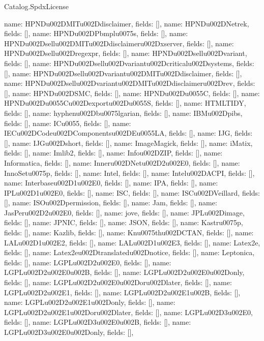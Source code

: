\begin{lexlean}{Catalog.SpdxLicense}
\begin{semanticmodule}
{    {name: HPNDu002DMITu002Ddisclaimer, fields: []},
    {name: HPNDu002DNetrek, fields: []},
    {name: HPNDu002DPbmplu0075s, fields: []},
    {name: HPNDu002Dsellu002DMITu002Ddisclaimeru002Dxserver, fields: []},
    {name: HPNDu002Dsellu002Dregexpr, fields: []},
    {name: HPNDu002Dsellu002Dvariant, fields: []},
    {name: HPNDu002Dsellu002Dvariantu002Dcriticalu002Dsystems, fields: []},
    {name: HPNDu002Dsellu002Dvariantu002DMITu002Ddisclaimer, fields: []},
    {name: HPNDu002Dsellu002Dvariantu002DMITu002Ddisclaimeru002Drev, fields: []},
    {name: HPNDu002DSMC, fields: []},
    {name: HPNDu002Du0055C, fields: []},
    {name: HPNDu002Du0055Cu002Dexportu002Du0055S, fields: []},
    {name: HTMLTIDY, fields: []},
    {name: hyphenu002Dbu0075lgarian, fields: []},
    {name: IBMu002Dpibs, fields: []},
    {name: ICu0055, fields: []},
    {name: IECu002DCodeu002DComponentsu002DEu0055LA, fields: []},
    {name: IJG, fields: []},
    {name: IJGu002Dshort, fields: []},
    {name: ImageMagick, fields: []},
    {name: iMatix, fields: []},
    {name: Imlib2, fields: []},
    {name: Infou002DZIP, fields: []},
    {name: Informatica, fields: []},
    {name: Inneru002DNetu002D2u002E0, fields: []},
    {name: InnoSetu0075p, fields: []},
    {name: Intel, fields: []},
    {name: Intelu002DACPI, fields: []},
    {name: Interbaseu002D1u002E0, fields: []},
    {name: IPA, fields: []},
    {name: IPLu002D1u002E0, fields: []},
    {name: ISC, fields: []},
    {name: ISCu002DVeillard, fields: []},
    {name: ISOu002Dpermission, fields: []},
    {name: Jam, fields: []},
    {name: JasPeru002D2u002E0, fields: []},
    {name: jove, fields: []},
    {name: JPLu002Dimage, fields: []},
    {name: JPNIC, fields: []},
    {name: JSON, fields: []},
    {name: Kastru0075p, fields: []},
    {name: Kazlib, fields: []},
    {name: Knu0075thu002DCTAN, fields: []},
    {name: LALu002D1u002E2, fields: []},
    {name: LALu002D1u002E3, fields: []},
    {name: Latex2e, fields: []},
    {name: Latex2eu002Dtranslatedu002Dnotice, fields: []},
    {name: Leptonica, fields: []},
    {name: LGPLu002D2u002E0, fields: []},
    {name: LGPLu002D2u002E0u002B, fields: []},
    {name: LGPLu002D2u002E0u002Donly, fields: []},
    {name: LGPLu002D2u002E0u002Doru002Dlater, fields: []},
    {name: LGPLu002D2u002E1, fields: []},
    {name: LGPLu002D2u002E1u002B, fields: []},
    {name: LGPLu002D2u002E1u002Donly, fields: []},
    {name: LGPLu002D2u002E1u002Doru002Dlater, fields: []},
    {name: LGPLu002D3u002E0, fields: []},
    {name: LGPLu002D3u002E0u002B, fields: []},
    {name: LGPLu002D3u002E0u002Donly, fields: []},
}
\end{semanticmodule}
\end{lexlean}
